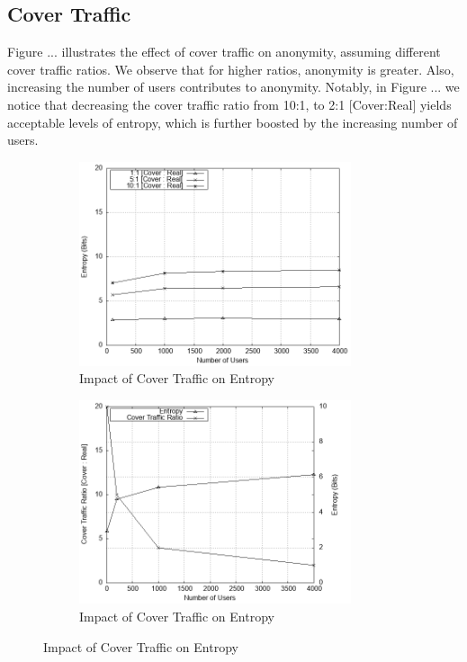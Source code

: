 \documentclass[logo,msc,cyber]{infthesis}   %
\begin{document}
\subsection{Cover Traffic}

Figure ... illustrates the effect of cover traffic on anonymity, assuming
different cover traffic ratios. We observe that for higher ratios, anonymity is
greater. Also, increasing the number of users contributes to anonymity. Notably,
in Figure ... we notice that decreasing the cover traffic ratio from 10:1,  to
2:1 [Cover:Real] yields acceptable levels of entropy, which is further boosted
by the increasing number of users. 


\begin{figure}[h!]
    \centering
    \begin{subfigure}[b]{0.45\textwidth}
        \centering
        \includegraphics[height=6cm]{figures/simulator/3.png}
        \caption{Impact of Cover Traffic on Entropy}
        \label{fig:cover-traffic-ratios}
    \end{subfigure}
    \hfill
    \begin{subfigure}[b]{0.45\textwidth}
        \centering
        \includegraphics[height=6cm]{figures/simulator/4.png}
        \caption{Impact of Cover Traffic on Entropy}
        \label{fig:cover-traffic-decreasing-ratios}
    \end{subfigure}
 \end{figure}
\end{document}
